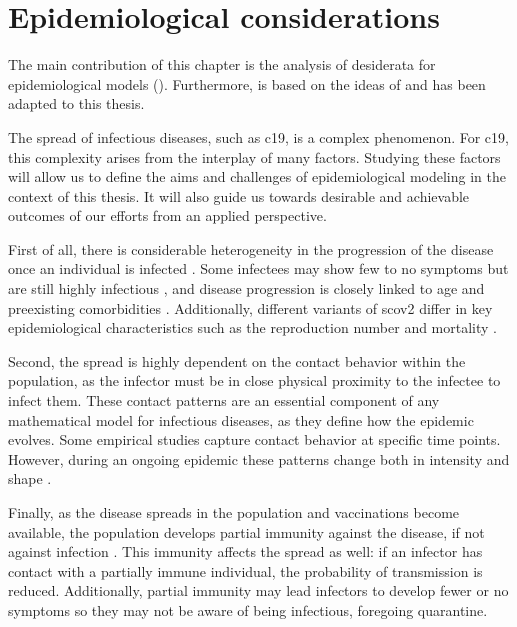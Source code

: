 \glsresetall
\chapter{Epidemiological considerations}
\label{chap:epidemiological_considerations}
\newpage
\begin{tcolorbox}[title={Contributions of this chapter}]
    The main contribution of this chapter is the analysis of desiderata for epidemiological models (). 
    Furthermore,  is based on the ideas of \citep{Heyder2023Measures} and has been adapted to this thesis.
\end{tcolorbox}
\newpage

The spread of infectious diseases, such as \acrshort{c19}, is a complex phenomenon. For \acrshort{c19}, this complexity arises from the interplay of many factors. Studying these factors will allow us to define the aims and challenges of epidemiological modeling in the context of this thesis. It will also guide us towards desirable and achievable outcomes of our efforts from an applied perspective.

First of all, there is considerable heterogeneity in the progression of the disease once an individual is infected \citep{Salzberger2021Epidemiology}. Some infectees may show few to no symptoms but are still highly infectious \citep{Byambasuren2020Estimating}, and disease progression is closely linked to age and preexisting comorbidities \citep{Biswas2020Association}. Additionally, different variants of \acrshort{scov2} differ in key epidemiological characteristics such as the reproduction number \citep{Du2022Reproduction} and mortality \citep{Hughes2023Effect}. 

Second, the spread is highly dependent on the contact behavior within the population, as the infector must be in close physical proximity to the infectee to infect them. These contact patterns are an essential component of any mathematical model for infectious diseases, as they define how the epidemic evolves. 
Some empirical studies \citep{Tomori2021Individual,Mossong2008Social} capture contact behavior at specific time points. However, during an ongoing epidemic these patterns change both in intensity and shape \citep{Tomori2021Individual}.

Finally, as the disease spreads in the population and vaccinations become available, the population develops partial immunity against the disease, if not against infection \citep{Wu2023Longterm}. This immunity affects the spread as well: if an infector has contact with a partially immune individual, the probability of transmission is reduced. Additionally, partial immunity may lead infectors to develop fewer or no symptoms so they may not be aware of being infectious, foregoing quarantine.

